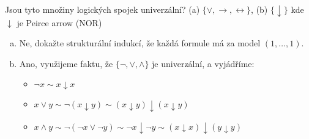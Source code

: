 \begin{problem} 
    
    Jsou tyto množiny logických spojek univerzální? (a) $\{\vee, \rightarrow, \leftrightarrow\}$, (b) $\{\downarrow\}$ kde $\downarrow$ je Peirce arrow (NOR)    

    \begin{solution}
        \begin{enumerate}[(a)]
            \item Ne, dokažte strukturální indukcí, že každá formule má za model $(1,\dots,1)$. 
            \item Ano, využijeme faktu, že $\{\neg,\lor,\land\}$ je univerzální, a vyjádříme:
            \begin{itemize}
                \item $\neg x\sim x\downarrow x$
                \item $x\lor y\sim\neg(x\downarrow y)\sim (x\downarrow y)\downarrow(x\downarrow y)$
                \item $x\land y\sim \neg(\neg x\lor \neg y)\sim \neg x\downarrow\neg y\sim (x\downarrow x)\downarrow(y\downarrow y)$
            \end{itemize}
        \end{enumerate}            
    \end{solution}

\end{problem}


